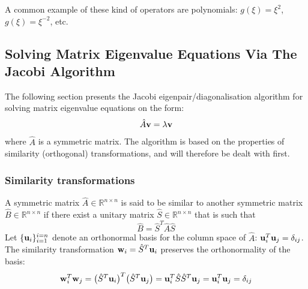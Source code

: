 \documentclass[reprint,english]{revtex4-1}
\begin{document}
A common example of these kind of operators are polynomials: \(g(\xi)=\xi^2\), \(g(\xi)=\xi^{-2}\), etc.

\subsection{Solving Matrix Eigenvalue Equations Via The Jacobi Algorithm}
The following section presents the Jacobi eigenpair/diagonalisation algorithm for solving matrix eigenvalue equations on the form:
\begin{equation}\label{eq:general_matrix_eigenvalue_problem}
\hat{A}\vb{v}=\lambda\vb{v}
\end{equation}
where \(\hat{A}\) is a symmetric matrix. The algorithm is based on the properties of similarity (orthogonal) transformations, and will therefore be dealt with first.
\subsubsection{Similarity transformations}
A symmetric matrix \(\hat{A}\in\mathbb{R}^{n\times n}\) is said to be similar to another symmetric matrix \(\hat{B}\in\mathbb{R}^{n\times n}\) if there exist a unitary matrix \(\hat{S}\in\mathbb{R}^{n\times n}\) that is such that
\begin{equation}\label{eq:definition_similar_matrix}
\hat{B}=\hat{S}^T\hat{A}\hat{S}
\end{equation}
Let \(\{\vb{u}_i\}_{i=1}^{i=n}\) denote an orthonormal basis for the column space of \(\hat{A}\): \(\vb{u}_i^T\vb{u}_j=\delta_{ij}\). The similarity transformation \(\vb{w}_i=\hat{S}^T\vb{u}_i\) preserves the orthonormality of the basis:
\[\vb{w}_i^T\vb{w}_j=\big(\hat{S}^T\vb{u}_i\big)^T\big(\hat{S}^T\vb{u}_j\big)=\vb{u}_i^T\hat{S}\hat{S}^T\vb{u}_j=\vb{u}_i^T\vb{u}_j=\delta_{ij}\]
\end{document}

